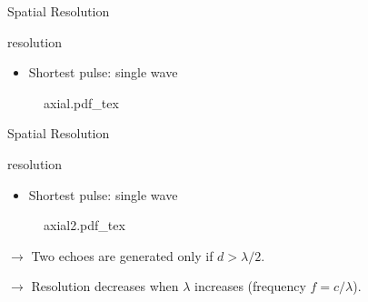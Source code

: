 \begin{frame}{Spatial Resolution \cont}

     resolution \cont
    \begin{itemize}
        \item Shortest pulse: single wave
    \end{itemize}

    \begin{figure}
        \def\svgwidth{\linewidth}
        {axial.pdf_tex}
    \end{figure}

\end{frame}


\begin{frame}{Spatial Resolution \cont}

     resolution \cont
    \begin{itemize}
        \item Shortest pulse: single wave
    \end{itemize}

    \begin{figure}
        \def\svgwidth{\linewidth}
        {axial2.pdf_tex}
    \end{figure}

    $\rightarrow$ Two  echoes are generated only if $d > \lambda/2$.

    $\rightarrow$ Resolution decreases when $\lambda$ increases (frequency $f = c/\lambda $).
\end{frame}


